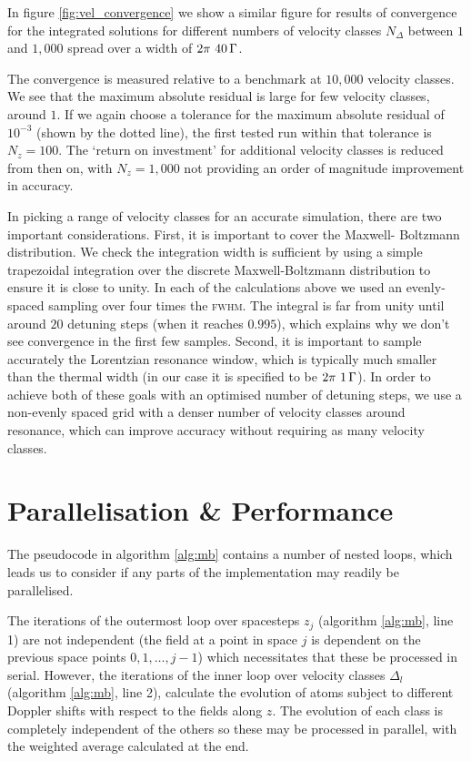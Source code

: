     In figure \ref{fig:vel_convergence} we show a similar figure for results of
    convergence for the integrated solutions for different numbers of velocity
    classes $N_\Delta$ between $1$ and $1,000$ spread over a width of
    $\unit[2\pi~40]{\Gamma}$.

    The convergence is measured relative to a benchmark at $10,000$ velocity
    classes.  We see that the maximum absolute residual is large for few
    velocity classes, around $1$. If we again choose a tolerance for the maximum
    absolute residual of $10^{-3}$ (shown by the dotted line), the first tested
    run within that tolerance is $N_z = 100$. The `return on investment' for
    additional velocity classes is reduced from then on, with $N_z = 1,000$ not
    providing an order of magnitude improvement in accuracy.

    In picking a range of velocity classes for an accurate simulation, there are
    two important considerations. First, it is important to cover the Maxwell-
    Boltzmann distribution. We check the integration width is sufficient by
    using a simple trapezoidal integration over the discrete Maxwell-Boltzmann
    distribution to ensure it is close to unity. In each of the calculations
    above we used an evenly-spaced sampling over four times the \textsc{fwhm}.
    The integral is far from unity until around $20$ detuning steps (when it
    reaches $0.995$), which explains why we don't see convergence in the first
    few samples.  Second, it is important to sample accurately the Lorentzian
    resonance window, which is typically much smaller than the thermal width (in
    our case it is specified to be $\unit[2\pi~1]{\Gamma}$). In order to achieve
    both of these goals with an optimised number of detuning steps, we use a
    non-evenly spaced grid with a denser number of velocity classes around
    resonance, which can improve accuracy without requiring as many velocity
    classes.

  \section{Parallelisation \&  Performance}

    The pseudocode in algorithm \ref{alg:mb} contains a number of nested loops,
    which leads us to consider if any parts of the implementation may readily be
    parallelised. 

    The iterations of the outermost loop over spacesteps $z_j$ (algorithm
    \ref{alg:mb}, line 1) are not independent (\ie the field at a point in space
    $j$ is dependent on the previous space points $0, 1, \dots, j-1$) which
    necessitates that these be processed in serial. However, the iterations of
    the inner loop over velocity classes $\Delta_l$ (algorithm \ref{alg:mb},
    line 2), calculate the evolution of atoms subject to different Doppler
    shifts with respect to the fields along $z$. The evolution of each class is
    completely independent of the others so these may be processed in parallel,
    with the weighted average calculated at the end.

